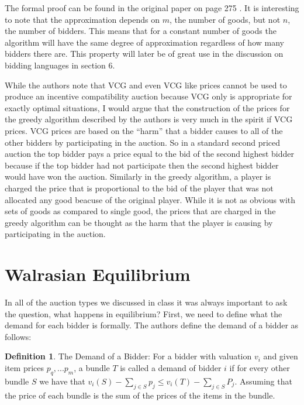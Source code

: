 \documentclass[10pt,onecolumn,letterpaper]{article}
\theoremstyle{definition}
\newtheorem{definition}{Definition}[section]
\begin{document}
The formal proof can be found in the original paper on page 275 \cite{paper}. It is interesting to note that the approximation depends on $m$, the number of goods, but not $n$, the number of bidders. This means that for a constant number of goods the algorithm will have the same degree of approximation regardless of how many bidders there are. This property will later be of great use in the discussion on bidding languages in section 6. 

While the authors note that VCG and even VCG like prices cannot be used to produce an incentive compatibility auction because VCG only is appropriate for exactly optimal situations, I would argue that the construction of the prices for the greedy algorithm described by the authors is very much in the spirit if VCG prices. VCG prices are based on the ``harm'' that a bidder causes to all of the other bidders by participating in the auction. So in a standard second priced auction the top bidder pays a price equal to the bid of the second highest bidder because if the top bidder had not participate then the second highest bidder would have won the auction. Similarly in the greedy algorithm, a player is charged the price that is proportional to the bid of the player that was not allocated any good beacuse of the original player. While it is not as obvious with sets of goods as compared to single good, the prices that are charged in the greedy algorithm can be thought as the harm that the player is causing by participating in the auction. 

\section{Walrasian Equilibrium} %

In all of the auction types we discussed in class it was always important to ask the question, what happens in equilibrium? First, we need to define what the demand for each bidder is formally. The authors define the demand of a bidder as follows:

\theoremstyle{definition}
\begin{definition}{The Demand of a Bidder:} For a bidder with valuation $v_i$ and given item prices $p_q,...p_m$, a bundle $T$ is called a demand of bidder $i$ if for every other bundle $S$ we have that $v_i(S) - \sum_{j \in S} p_j \leq v_i(T) - \sum_{j \in S} P_j$. Assuming that the price of each bundle is the sum of the prices of the items in the bundle.
\end{definition}
\end{document}
